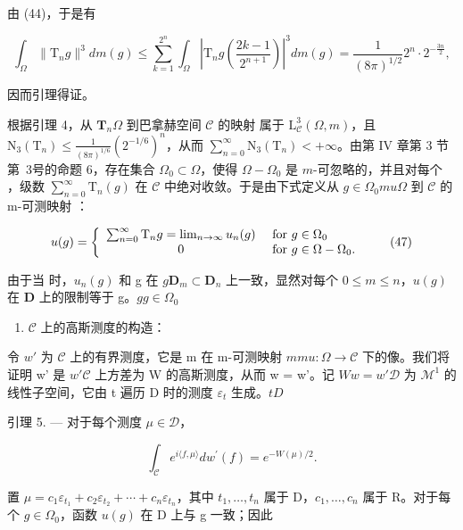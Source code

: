 由 (44)，于是有

\[
\int_ {\Omega} \| \mathrm{T} _ {n} g \| ^ {3} d m (g) \leqslant \sum_ {k = 1} ^ {2 ^ {n}} \int_ {\Omega} \left| \mathrm{T} _ {n} g \left(\frac {2 k - 1}{2 ^ {n + 1}}\right) \right| ^ {3} d m (g) = \frac {1}{(8 \pi) ^ {1 / 2}} 2 ^ {n} \cdot 2 ^ {- \frac {3 n}{2}},
\]

因而引理得证。

根据引理 4，从 \(\mathbf{T}_n\)\(\Omega\) 到巴拿赫空间 \(\mathcal{C}\) 的映射  属于 \(\mathrm{L}_{\mathcal{C}}^3 (\Omega ,m)\)，且 \(\mathrm{N}_3(\mathrm{T}_n)\leqslant \frac{1}{(8\pi)^{1 / 6}} (2^{-1 / 6})^n\)，从而 \(\sum_{n = 0}^{\infty}\mathrm{N}_3(\mathrm{T}_n) < + \infty\)。由第 IV 章第 3 节第~3号的命题 6，存在集合 \(\Omega_0\subset \Omega\)，使得 \(\Omega -\Omega_0\) 是 \(m\)-可忽略的，并且对每个 ，级数 \(\sum_{n = 0}^{\infty}\mathrm{T}_n(g)\) 在 \(\mathcal{C}\) 中绝对收敛。于是由下式定义从 \(g\in \Omega_0\)\(m\)\(u\)\(\Omega\) 到 \(\mathcal{C}\) 的 m-可测映射 ：

\[
u (g) = \left\{ \begin{array}{c l} \sum_ {n = 0} ^ {\infty} \mathrm{T} _ {n} g = \lim _ {n \to \infty} u _ {n} (g) & \text { for } g \in \Omega_ {0} \\ 0 & \text { for } g \in \Omega - \Omega_ {0}. \end{array} \right.\tag{47}
\]

由于当  时，\(u_{n}(g)\) 和 g 在 \(g\)\(\mathbf{D}_m \subset \mathbf{D}_n\) 上一致，显然对每个 \(0 \leqslant m \leqslant n\)，\(u(g)\) 在 \(\mathbf{D}\) 上的限制等于 g。\(g\)\(g \in \Omega_0\)

\begin{enumerate}
\def\labelenumi{\Alph{enumi})}
\setcounter{enumi}{2}
\tightlist
\item
  \(\mathcal{C}\) 上的高斯测度的构造：
\end{enumerate}

令 \(w'\) 为 \(\mathcal{C}\) 上的有界测度，它是 m 在 m-可测映射 \(m\)\(m\)\(u: \Omega \to \mathcal{C}\) 下的像。我们将证明 w' 是 \(w'\)\(\mathcal{C}\) 上方差为 W 的高斯测度，从而 w = w'。记 \(W\)\(w = w'\)\(\mathcal{D}\) 为 \(\mathcal{M}^1\) 的线性子空间，它由 t 遍历 D 时的测度 \(\varepsilon_t\) 生成。\(t\)\(D\)

引理 5. --- 对于每个测度 \(\mu \in \mathcal{D}\)，

\[
\int_ {\mathcal {C}} e ^ {i \langle f, \mu \rangle} d w ^ {\prime} (f) = e ^ {- W (\mu) / 2}.\tag{48}
\]

置 \(\mu=c_{1}\varepsilon_{t_{1}}+c_{2}\varepsilon_{t_{2}}+\cdots+c_{n}\varepsilon_{t_{n}}\)，其中 \(t_{1},\ldots,t_{n}\) 属于 D，\(c_{1},\ldots,c_{n}\) 属于 R。对于每个 \(g\in\Omega_{0}\)，函数 \(u(g)\) 在 D 上与 g 一致；因此

